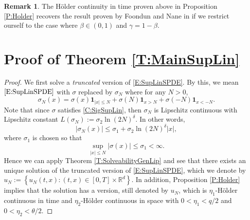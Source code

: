 \documentclass[12pt]{report}
\theoremstyle{plain}
\theoremstyle{definition}
\newtheorem{remark}[theorem]{Remark}
\numberwithin{equation}{section}
\newcommand{\R}{\mathbb{R}}
\begin{document}
\begin{remark}
	The H\"older continuity in time proven above in Proposition \ref{P:Holder} recovers the result proven by Foondun and Nane in \cite[Theorem 1.9]{foondun.nane:17:asymptotic} if we restrict ourself to the case where $\beta \in (0,1)$ and $\gamma = 1-\beta$. 
\end{remark}


\section{Proof of Theorem \ref{T:MainSupLin}} \label{S:TMainSupLin}

\begin{proof}
	We first solve a {\it truncated} version of \eqref{E:SupLinSPDE}. By this, we mean $\eqref{E:SupLinSPDE}$ with $\sigma$ replaced by $\sigma_N$ where for any $N >0$,
	\[
	\sigma_N(x) = \sigma(x) \textbf{1}_{|x| \le N} + \sigma(N)\textbf{1}_{x > N} + \sigma(-N)\textbf{1}_{x< -N}.
	\]
	Note that since $\sigma$ satisfies \eqref{C:SigSupLin}, then $\sigma_N$ is Lipschitz continuous with Lipschitz constant $L(\sigma_N) := \sigma_2 \ln(2N)^{\delta}$. In other words, 
	\[
	|\sigma_N(x)| \le \sigma_1 + \sigma_2 \ln(2N)^{\delta}|x|,
	\]
	where $\sigma_1$ is chosen so that 
	\[
	\sup_{|x| \le N} |\sigma(x)| \le \sigma_1 < \infty.
	\]
	Hence we can apply Theorem \ref{T:SolveabilityGenLip} and see that there exists an unique solution of the truncated version of \eqref{E:SupLinSPDE}, which we denote by $u_N := \left\{ u_N(t,x) : (t,x) \in [0,T] \times \R^d \right\}$. In addition, Proposition \ref{P:Holder} implies that the solution has a version, still denoted by $u_N$, which is $\eta_1$-H\"older continuous in time and $\eta_2$-H\"older continuous in space  with $0<\eta_1 < q/2$ and $0<\eta_2 < \theta/2$.
	

\end{proof}
\end{document}

